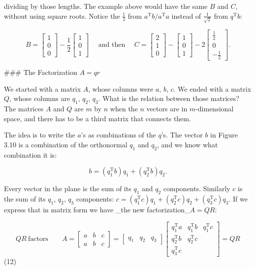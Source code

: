 dividing by those lengths. The example above would have the same \(B\) and \(C\), without using square roots. Notice the \(\frac{1}{2}\) from \(a^{\mathrm{T}}b/a^{\mathrm{T}}a\) instead of \(\frac{1}{\sqrt{2}}\) from \(q^{\mathrm{T}}b\):

\[B=\begin{bmatrix}1\\ 0\\ 0\end{bmatrix}-\frac{1}{2}\begin{bmatrix}1\\ 0\\ 1\end{bmatrix}\quad\text{ and then }\quad C=\begin{bmatrix}2\\ 1\\ 0\end{bmatrix}-\begin{bmatrix}1\\ 0\\ 1\end{bmatrix}-2\begin{bmatrix}\frac{1}{2}\\ 0\\ -\frac{1}{2}\end{bmatrix}.\]

### The Factorization \(A=qr\)

We started with a matrix \(A\), whose columns were \(a\), \(b\), \(c\). We ended with a matrix \(Q\), whose columns are \(q_{1}\), \(q_{2}\), \(q_{3}\). What is the relation between those matrices? The matrices \(A\) and \(Q\) are \(m\) by \(n\) when the \(n\) vectors are in \(m\)-dimensional space, and there has to be a third matrix that connects them.

The idea is to write the \(a\)'s as combinations of the \(q\)'s. The vector \(b\) in Figure 3.10 is a combination of the orthonormal \(q_{1}\) and \(q_{2}\), and we know what combination it is:

\[b=(q_{1}^{\mathrm{T}}b)q_{1}+(q_{2}^{\mathrm{T}}b)q_{2}.\]

Every vector in the plane is the sum of its \(q_{1}\) and \(q_{2}\) components. Similarly \(c\) is the sum of its \(q_{1}\), \(q_{2}\), \(q_{3}\) components: \(c=(q_{1}^{\mathrm{T}}c)q_{1}+(q_{2}^{\mathrm{T}}c)q_{2}+(q_{3}^{\mathrm{T}}c)q _{3}\). If we express that in matrix form we have _the new factorization_\(A=QR\):

\[QR\ \text{factors}\qquad A=\begin{bmatrix}a&b&c\\ a&b&c\end{bmatrix}=\begin{bmatrix}q_{1}&q_{2}&q_{3}\end{bmatrix}\begin{bmatrix} q_{1}^{\mathrm{T}}a&q_{1}^{\mathrm{T}}b&q_{1}^{\mathrm{T}}c\\ q_{2}^{\mathrm{T}}b&q_{2}^{\mathrm{T}}c\\ q_{3}^{\mathrm{T}}c\end{bmatrix}=QR\] (12)

